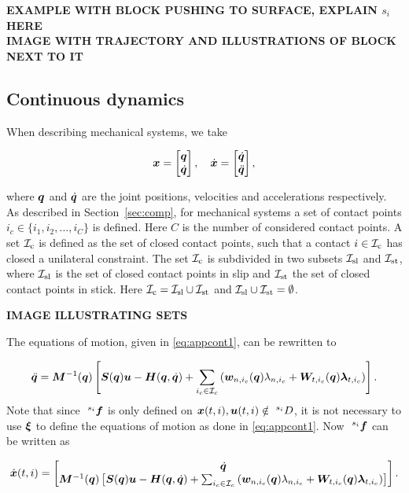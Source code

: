 \documentclass[../DC2017114Bouma.tex]{subfiles}
\begin{document}
\textbf{EXAMPLE WITH BLOCK PUSHING TO SURFACE, EXPLAIN $s_i$ HERE}\\
\textbf{IMAGE WITH TRAJECTORY AND ILLUSTRATIONS OF BLOCK NEXT TO IT}

\subsection{Continuous dynamics}\label{sec:2contdyn}
When describing mechanical systems, we take 

\begin{align}
{\boldsymbol{x}} = \begin{bmatrix}
{\boldsymbol{q}}\\ \dot{{\boldsymbol{q}}}
\end{bmatrix},\quad
\dot{{\boldsymbol{x}}} = \begin{bmatrix}
\dot{{\boldsymbol{q}}}\\ \ddot{{\boldsymbol{q}}}
\end{bmatrix},
\end{align}

where ${\boldsymbol{q}}$ and $\dot{{\boldsymbol{q}}}$ are the joint positions, velocities and accelerations respectively. As described in Section~\ref{sec:comp}, for mechanical systems a set of contact points $i_c\in\{i_1,i_2,...,i_C\}$ is defined. Here $C$ is the number of considered contact points. A set $\mathcal{I}_\text{c}$ is defined as the set of closed contact points, such that a contact $i\in\mathcal{I}_\text{c}$ has closed a unilateral constraint. The set $\mathcal{I}_\text{c}$ is subdivided in two subsets $\mathcal{I}_{\text{sl}}$ and $\mathcal{I}_{\text{st}}$, where $\mathcal{I}_{\text{sl}}$ is the set of closed contact points in slip and $\mathcal{I}_{\text{st}}$ the set of closed contact points in stick. Here $\mathcal{I}_\text{c} =\mathcal{I}_{\text{sl}}\cup\mathcal{I}_{\text{st}}$ and $\mathcal{I}_{\text{sl}}\cup\mathcal{I}_{\text{st}}=\emptyset$. 

\textbf{IMAGE ILLUSTRATING SETS}

The equations of motion, given in \eqref{eq:appcont1}, can be rewritten to

\begin{align}
\ddot{{\boldsymbol{q}}} = {\boldsymbol{M}}^{-1}({\boldsymbol{q}})\left[ {\boldsymbol{S}}({\boldsymbol{q}}){\boldsymbol{u}} - {\boldsymbol{H}}({\boldsymbol{q}},\dot{{\boldsymbol{q}}}) + \sum_{i_c\in\mathcal{I}_c}\left({\boldsymbol{w}}_{n,i_c}({\boldsymbol{q}})\lambda_{n,i_c} + {\boldsymbol{W}}_{t,i_c}({\boldsymbol{q}})\boldsymbol{\lambda}_{t,i_c} \right)\right].\label{eq:qddot}
\end{align}
Note that since $\ ^{s_i}\fb$ is only defined on ${\boldsymbol{x}}(t,i),{\boldsymbol{u}}(t,i)\notin \ ^{s_i}D$, it is not necessary to use $\boldsymbol{\xi}$ to define the equations of motion as done in \eqref{eq:appcont1}. Now $\ ^{s_i}\fb$ can be written as

\begin{align}
\dot{{\boldsymbol{x}}}(t,i) =\begin{bmatrix}
\dot{{\boldsymbol{q}}}\\ {\boldsymbol{M}}^{-1}({\boldsymbol{q}})\left[ {\boldsymbol{S}}({\boldsymbol{q}}){\boldsymbol{u}} - {\boldsymbol{H}}({\boldsymbol{q}},\dot{{\boldsymbol{q}}}) + \sum_{i_c\in\mathcal{I}_c}\left({\boldsymbol{w}}_{n,i_c}({\boldsymbol{q}})\lambda_{n,i_c} + {\boldsymbol{W}}_{t,i_c}({\boldsymbol{q}})\boldsymbol{\lambda}_{t,i_c} \right)\right]
\end{bmatrix}.\label{eq:fcont}
\end{align}
\end{document}
